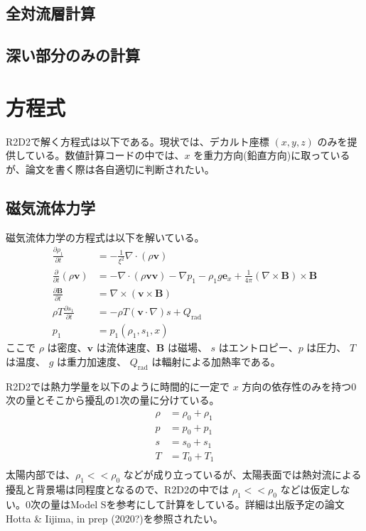 \documentclass[letterpaper,10pt,dvipdfmx,report]{sphinxmanual}
\begin{document}
\section{全対流層計算}
\label{\detokenize{typical_case:id4}}

\section{深い部分のみの計算}
\label{\detokenize{typical_case:id5}}

\chapter{方程式}
\label{\detokenize{equation:id1}}\label{\detokenize{equation::doc}}
R2D2で解く方程式は以下である。現状では、デカルト座標 \((x,y,z)\)  のみを提供している。数値計算コードの中では、\(x\) を重力方向(鉛直方向)に取っているが、論文を書く際は各自適切に判断されたい。


\section{磁気流体力学}
\label{\detokenize{equation:id2}}
磁気流体力学の方程式は以下を解いている。
\begin{equation*}
\begin{split}\frac{\partial \rho_1}{\partial t} &= - \frac{1}{\xi^2}\nabla\cdot
\left(\rho \boldsymbol{v}\right) \\
\frac{\partial}{\partial t}\left(\rho \boldsymbol{v}\right) &=
-\nabla\cdot\left(\rho\boldsymbol{vv}\right)
- \nabla p_1 - \rho_1 g\boldsymbol{e}_x
+\frac{1}{4\pi}\left(\nabla\times\boldsymbol{B}\right)
\times\boldsymbol{B} \\
\frac{\partial \boldsymbol{B}}{\partial t} &=
\nabla\times\left(\boldsymbol{v\times B}\right)
\\
\rho T \frac{\partial s_1}{\partial t} &= -\rho T
\left(\boldsymbol{v}\cdot\nabla\right) s + Q_\mathrm{rad} \\
p_1 &= p_1(\rho_1,s_1,x)\end{split}
\end{equation*}
ここで \(\rho\) は密度、\(\boldsymbol{v}\) は流体速度、\(\boldsymbol{B}\) は磁場、 \(s\) はエントロピー、\(p\) は圧力、 \(T\) は温度、 \(g\) は重力加速度、 \(Q_\mathrm{rad}\) は輻射による加熱率である。

R2D2では熱力学量を以下のように時間的に一定で \(x\) 方向の依存性のみを持つ0次の量とそこから擾乱の1次の量に分けている。
\begin{equation*}
\begin{split}\rho &= \rho_0 + \rho_1 \\
p &= p_0 + p_1 \\
s &= s_0 + s_1 \\
T &= T_0 + T_1 \\\end{split}
\end{equation*}
太陽内部では、\(\rho_1 << \rho_0\) などが成り立っているが、太陽表面では熱対流による擾乱と背景場は同程度となるので、R2D2の中では \(\rho_1 << \rho_0\) などは仮定しない。0次の量はModel Sを参考にして計算をしている。詳細は出版予定の論文Hotta \& Iijima, in prep (2020?)を参照されたい。
\end{document}
